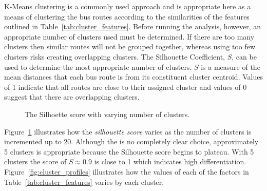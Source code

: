 \documentclass[11pt]{article}
\begin{document}
K-Means clustering is a commonly used approach and is appropriate here as a means of clustering the bus routes according to the similarities of the features outlined in Table~\ref{tab:cluster_features}. Before running the analysis, however, an appropriate number of clusters used must be determined. If there are too many clusters then similar routes will not be grouped together, whereas using too few clusters risks creating overlapping clusters. The Silhouette Coefficient, $S$, can be used to determine the most appropriate number of clusters. $S$ is a measure of the mean distances that each bus route is from its constituent cluster centroid. Values of 1 indicate that all routes are close to their assigned cluster and values of 0 suggest that there are overlapping clusters. 

\begin{figure}[ht] \begin{center} 
 \caption{The Silhoette score with varying number of clusters.} \label{fig:silhouette} \end{center} \end{figure} %

Figure~\ref{fig:silhouette} illustrates how the \textit{silhouette score} varies as the number of clusters is incremented up to 20. Although the is no completely clear choice, approximately 5 clusters is appropriate because the Silhouette score begins to plateau. With 5 clusters the score of $S\approx0.9$ is close to 1 which indicates high differentiation. Figure~\ref{fig:cluster_profiles} illustrates how the values of each of the factors in Table~\ref{tab:cluster_features} varies by each cluster. 
\end{document}
